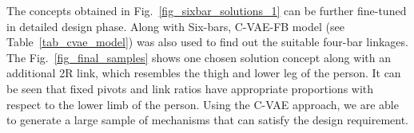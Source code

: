 The concepts obtained in Fig.~\ref{fig_sixbar_solutions_1} can be further fine-tuned in detailed design phase.
Along with Six-bars, C-VAE-FB model (see Table~\ref{tab_cvae_model}) was also used to find out the suitable four-bar linkages.
The Fig.~\ref{fig_final_samples} shows one chosen solution concept along with an additional 2R link, which resembles the thigh and lower leg of the person. It can be seen that fixed pivots and link ratios have appropriate proportions with respect to the lower limb of the person. Using the C-VAE approach, we are able to generate a large sample of mechanisms that can satisfy the design requirement. 
